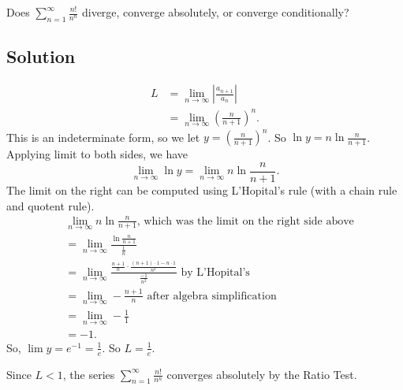 \documentclass{article}
\begin{document}
\noindent
Does $\displaystyle \sum_{n=1}^\infty \frac{n!}{n^n}$
diverge, converge absolutely, or converge conditionally?

\subsection*{Solution}

\begin{align*}
L&=\lim_{n \to \infty} \left|\frac{a_{n+1}}{a_n}\right|\\
&= \lim_{n \to \infty}  \left(\frac{n}{n+1}\right)^n.
\end{align*}
This is an indeterminate form, so we let $y = \left(\frac{n}{n+1}\right)^n$. So $\ln y = n \ln \frac{n}{n+1}$. Applying limit to both sides, we have
\[ \lim_{n \to \infty} \ln y =  \lim_{n \to \infty}  n \ln \frac{n}{n+1}.\]
The limit on the right can be computed using L'Hopital's rule (with a chain rule and quotent rule).
\begin{align*}
&\lim_{n \to \infty}  n \ln \frac{n}{n+1} \text{, which was the limit on the right side above}\\
&= \lim_{n \to \infty} \frac{ \ln \frac{n}{n+1}}{\frac1n}\\
&= \lim_{n \to \infty} \frac{ \frac{n+1}{n} \cdot \frac{(n+1) \cdot 1 - n \cdot 1}{n^2}}{\frac{-1}{n^2}} \text{ by L'Hopital's}\\
&= \lim_{n \to \infty} -\frac{n+1}{n} \text{ after algebra simplification}\\
&= \lim_{n \to \infty} -\frac11\\
&= -1.
\end{align*}
So, $\lim y = e^{-1} = \frac1e$. So $L=\frac1e$.

Since $L<1$, the series $\displaystyle \sum_{n=1}^\infty \frac{n!}{n^n}$ converges absolutely by the Ratio Test.
\end{document}
